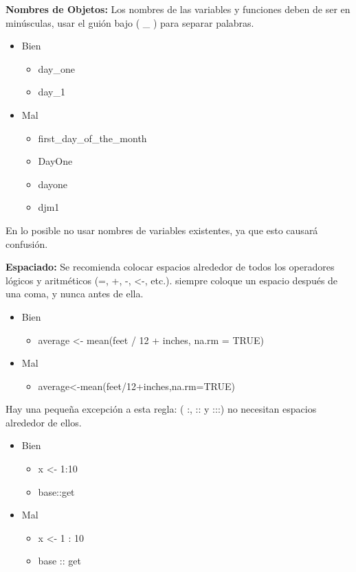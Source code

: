 \begin{enumerate}
\textbf{Nombres de Objetos:} Los nombres de las variables y funciones deben de ser en min\'usculas, usar el gui\'on bajo ( \_ ) para separar palabras.
\begin{itemize}
\item Bien  
\begin{itemize}
     \item day\_one
     \item day\_1
  \end{itemize}
\item Mal
   \begin{itemize}
      \item first\_day\_of\_the\_month
      \item DayOne
      \item dayone
      \item djm1
    \end{itemize}
 \end{itemize}
En lo posible no usar nombres de variables existentes, ya que esto causar\'a confusi\'on.

\textbf{Espaciado:} Se recomienda colocar espacios alrededor de todos los operadores l\'ogicos y aritm\'eticos (=, +, -, \textless-, etc.). siempre coloque un espacio despu\'es de una coma, y nunca antes de ella.

\begin{itemize}
\item Bien  
\begin{itemize}
     \item average \textless- mean(feet / 12 + inches, na.rm = TRUE)
  \end{itemize}
\item Mal
   \begin{itemize}
      \item average\textless-mean(feet/12+inches,na.rm=TRUE)
   \end{itemize}
 \end{itemize}
 
Hay una pequeña excepci\'on a esta regla: ( :, :: y :::) no necesitan espacios alrededor de ellos.

\begin{itemize}
\item Bien  
\begin{itemize}
     \item x \textless- 1:10
     \item base::get
  \end{itemize}
\item Mal
   \begin{itemize}
      \item x \textless- 1 : 10
     \item base :: get
   \end{itemize}
 \end{itemize}


\end{enumerate}
